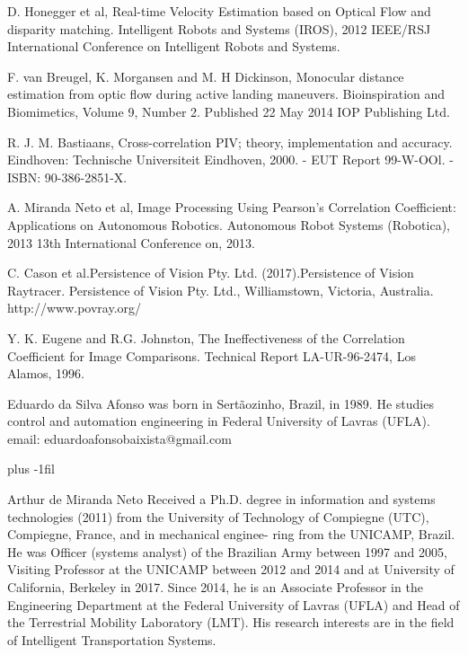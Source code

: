 \documentclass[letterpaper, 10 pt,conference]{ieeeconf}  %
\begin{document}
\begin{thebibliography}{99}

         D. Honegger et al, Real-time Velocity Estimation based on Optical Flow and disparity matching.
         Intelligent Robots and Systems (IROS), 2012 IEEE/RSJ International Conference on Intelligent Robots and Systems.
        
         F. van Breugel, K. Morgansen and M. H Dickinson, Monocular distance estimation from optic flow during
        active landing maneuvers. Bioinspiration and Biomimetics, Volume 9, Number 2. Published 22 May 2014 IOP Publishing Ltd.


	 R. J. M. Bastiaans, Cross-correlation PIV; theory, implementation and accuracy. 
        Eindhoven: Technische Universiteit Eindhoven, 2000. - EUT Report 99-W-OOl. - ISBN: 90-386-2851-X.

         A. Miranda Neto et al, Image Processing Using Pearson's Correlation Coefficient: 
        Applications on Autonomous Robotics. 
        Autonomous Robot Systems (Robotica), 2013 13th International Conference on, 2013.
        
          C. Cason et al.Persistence of Vision Pty. Ltd. (2017).Persistence of Vision Raytracer.
	Persistence of Vision Pty. Ltd., Williamstown, Victoria, Australia. http://www.povray.org/
	
	 Y. K. Eugene and R.G. Johnston, The Ineffectiveness of the Correlation Coefficient for Image Comparisons.
        Technical Report LA-UR-96-2474, Los Alamos, 1996.
	
\end{thebibliography}
\begin{biography}{Eduardo da Silva Afonso}
was born in Sertãozinho, Brazil, in 1989. He studies control and automation engineering in Federal University of Lavras (UFLA).
email: eduardoafonsobaixista@gmail.com
\end{biography}
\vskip 0pt plus -1fil
\begin{biography}{Arthur de Miranda Neto}
 Received a Ph.D. degree
in information and systems technologies (2011) from
the University of Technology of Compiegne (UTC),
Compiegne, France, and in mechanical enginee-
ring from the UNICAMP, Brazil. He was Officer
(systems analyst) of the Brazilian Army between
1997 and 2005, Visiting Professor at the UNICAMP
between 2012 and 2014 and at University of California, 
Berkeley in 2017. Since 2014, he is an
Associate Professor in the Engineering Department
at the Federal University of Lavras (UFLA) and
Head of the Terrestrial Mobility Laboratory (LMT). His research interests
are in the field of Intelligent Transportation Systems.
\end{biography}
\end{document}
